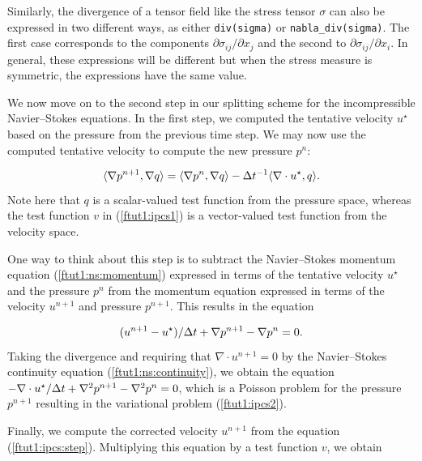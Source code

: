 \documentclass[graybox,envcountchap,sectrefs,final]{svmonodo}
\newenvironment{warning_mdfboxadmon}[1][]{
\begin{warning_mdfboxmdframed}[frametitle=#1]
}
{
\end{warning_mdfboxmdframed}
}
\begin{document}
\begin{warning_mdfboxadmon}
Similarly, the divergence of a tensor field like the stress tensor
$\sigma$ can also be expressed in two different ways, as either
\texttt{div(sigma)} or \Verb!nabla_div(sigma)!. The first case corresponds to the
components $\partial \sigma_{ij}/{\partial x_j}$ and the second to
$\partial \sigma_{ij}/{\partial x_i}$. In general, these expressions
will be different but when the stress measure is symmetric, the
expressions have the same value.
\end{warning_mdfboxadmon} %

We now move on to the second step in our splitting scheme for the
incompressible Navier--Stokes equations. In the first step, we computed
the tentative velocity $u^{\star}$ based on the pressure from the
previous time step. We may now use the computed tentative velocity to
compute the new pressure $p^n$:

\begin{equation}
\label{ftut1:ipcs2}
  \langle \nabla p^{n+1}, \nabla q \rangle
  = \langle {\nabla p^{n}},{\nabla q} \rangle
  - \dt^{-1} \langle{\nabla \cdot u^{\star}},{q} \rangle.
\end{equation}
Note here that $q$ is a scalar-valued test function from the pressure
space, whereas the test function $v$ in (\ref{ftut1:ipcs1}) is a
vector-valued test function from the velocity space.

One way to think about this step is to subtract the Navier--Stokes
momentum equation (\ref{ftut1:ns:momentum}) expressed in terms of the
tentative velocity $u^{\star}$ and the pressure $p^n$ from the
momentum equation expressed in terms of the velocity $u^{n+1}$ and
pressure $p^{n+1}$. This results in the equation

\begin{equation} \label{ftut1:ipcs:step}
  (u^{n+1} - u^{\star}) / \dt + \nabla p^{n+1} - \nabla p^n = 0.
\end{equation}
Taking the divergence and requiring that $\nabla \cdot u^{n+1} = 0$ by the
Navier--Stokes continuity equation (\ref{ftut1:ns:continuity}), we
obtain the equation $-\nabla\cdot u^{\star} / \dt + \nabla^2 p^{n+1} -
\nabla^2 p^n = 0$, which is a Poisson problem for the pressure $p^{n+1}$
resulting in the variational problem (\ref{ftut1:ipcs2}).

Finally, we compute the corrected velocity $u^{n+1}$ from the equation
(\ref{ftut1:ipcs:step}). Multiplying this equation by a test function
$v$, we obtain
\end{document}

